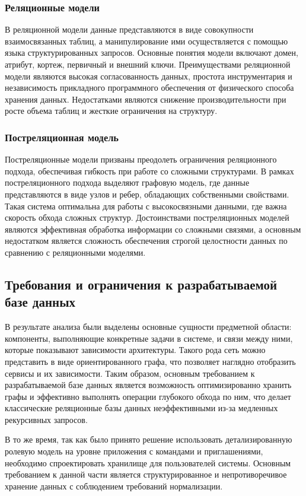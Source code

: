 \subsubsection{Реляционные модели}
В реляционной модели данные представляются в виде совокупности взаимосвязанных таблиц, а
манипулирование ими осуществляется с помощью языка структурированных запросов. Основные
понятия модели включают домен, атрибут, кортеж, первичный и внешний ключи. Преимуществами
реляционной модели являются высокая согласованность данных, простота инструментария и
независимость прикладного программного обеспечения от физического способа хранения
данных. Недостатками являются снижение производительности при росте объема таблиц и
жесткие ограничения на структуру.

\subsubsection{Постреляционная модель}
Постреляционные модели призваны преодолеть ограничения реляционного подхода, обеспечивая
гибкость при работе со сложными структурами. В рамках постреляционного подхода выделяют
графовую модель, где данные представляются в виде узлов и ребер, обладающих собственными
свойствами. Такая система оптимальна для работы с высокосвязными данными, где важна
скорость обхода сложных структур. Достоинствами постреляционных моделей являются
эффективная обработка информации со сложными связями, а основным недостатком является
сложность обеспечения строгой целостности данных по сравнению с реляционными моделями.

\subsection{Требования и ограничения к разрабатываемой базе данных}
В результате анализа были выделены основные сущности предметной области: компоненты,
выполняющие конкретные задачи в системе, и связи между ними, которые показывают
зависимости архитектуры. Такого рода сеть можно представить в виде ориентированного
графа, что позволяет наглядно отобразить сервисы и их зависимости. Таким образом,
основным требованием к разрабатываемой базе данных является возможность оптимизированно
хранить графы и эффективно выполнять операции глубокого обхода по ним, что делает
классические реляционные базы данных неэффективными из-за медленных рекурсивных запросов.

В то же время, так как было принято решение использовать детализированную ролевую модель
на уровне приложения с командами и приглашениями, необходимо спроектировать хранилище для
пользователей системы. Основным требованием к данной части является структурированное и
непротиворечивое хранение данных с соблюдением требований нормализации.

